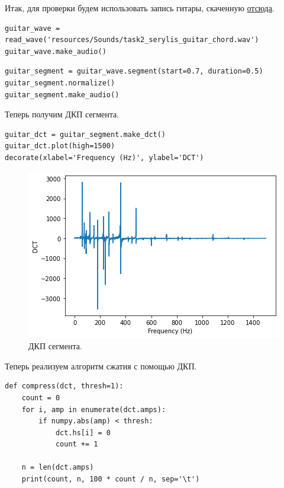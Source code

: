 \documentclass[a4paper, 14pt]{extarticle}
\begin{document}
    Итак, для проверки будем использовать запись гитары, скаченную \href{https://freesound.org/people/SeryLis/sounds/181425/}{отсюда}.

    \begin{lstlisting}[caption= Чтение файла и получение \texttt{wave}., label={lst:task2_wave}]
guitar_wave = read_wave('resources/Sounds/task2_serylis_guitar_chord.wav')
guitar_wave.make_audio()    \end{lstlisting}

    \begin{lstlisting}[caption= Выбор сегмента., label={lst:task2_segment}]
guitar_segment = guitar_wave.segment(start=0.7, duration=0.5)
guitar_segment.normalize()
guitar_segment.make_audio() \end{lstlisting}

    Теперь получим ДКП сегмента.

    \begin{lstlisting}[caption= Получение ДКП., label={lst:task2_dct}]
guitar_dct = guitar_segment.make_dct()
guitar_dct.plot(high=1500)
decorate(xlabel='Frequency (Hz)', ylabel='DCT')     \end{lstlisting}

    \begin{figure}[h]
        \centering
        \includegraphics[width=0.8\linewidth]{resources/Images/task2_dct}
        \caption{ДКП сегмента.}
        \label{fig:task2_dct}
    \end{figure}

    Теперь реализуем алгоритм сжатия с помощью ДКП.

    \begin{lstlisting}[caption= Функция \texttt{compress} для сжатия., label={lst:task2_fun}]
def compress(dct, thresh=1):
    count = 0
    for i, amp in enumerate(dct.amps):
        if numpy.abs(amp) < thresh:
            dct.hs[i] = 0
            count += 1

    n = len(dct.amps)
    print(count, n, 100 * count / n, sep='\t')  \end{lstlisting}
\end{document}
